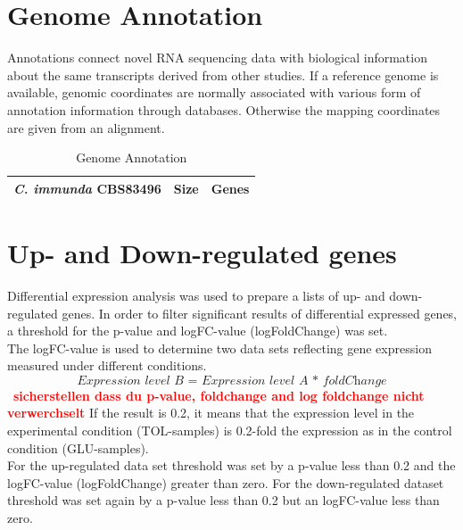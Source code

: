 \documentclass[12pt, a4paper]{report}
\newcommand{\HT}[1]{\textcolor{red}\textbf{#1}}
\begin{document}
\section{Genome Annotation}
Annotations connect novel RNA sequencing data with biological information about the same transcripts derived from other studies. If a reference genome is available, genomic coordinates are normally associated with various form of annotation information through databases. Otherwise the mapping coordinates are given from an alignment. 
\begin{table}[H]
	\centering
\begin{tabular}{c|c|c}
	\hline
	\textbf{\textit{C. immunda} CBS83496} & \textbf{Size} & \textbf{Genes} \\
	\hline
\end{tabular}
\caption{Genome Annotation}
\end{table}

\section{Up- and Down-regulated genes}
Differential expression analysis was used to prepare a lists of up- and down-regulated genes. In order to filter significant results of differential expressed genes, a threshold for the p-value and logFC-value (logFoldChange) was set. \\
The logFC-value is used to determine two data sets reflecting gene expression measured under different conditions. 
\[
\textit{Expression level B = Expression level A * foldChange}
\]
~\HT{sicherstellen dass du p-value, foldchange and log foldchange nicht verwerchselt}
If the result is 0.2, it means that the expression level in the experimental condition (TOL-samples) is 0.2-fold the expression as in the control condition (GLU-samples). \\
For the up-regulated data set threshold was set by a p-value less than 0.2 and the logFC-value (logFoldChange) greater than zero. For the down-regulated dataset threshold was set again by a p-value less than 0.2 but an logFC-value less than zero. \\
\end{document}
